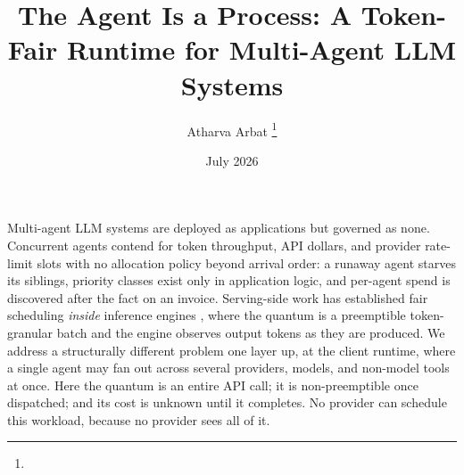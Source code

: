 \documentclass[letterpaper,11pt,leqno]{article}
\begin{document}
\title{The Agent Is a Process: A Token-Fair Runtime for Multi-Agent LLM Systems}

\author{Atharva Arbat
\thanks{}}

\date{July 2026}


\begin{titlepage}
\maketitle

Multi-agent LLM systems are deployed as applications but governed as none. Concurrent agents contend for token throughput, API dollars, and provider rate-limit slots with no allocation policy beyond arrival order: a runaway agent starves its siblings, priority classes exist only in application logic, and per-agent spend is discovered after the fact on an invoice. Serving-side work has established fair scheduling \emph{inside} inference engines \citep{Sheng24}, where the quantum is a preemptible token-granular batch and the engine observes output tokens as they are produced. We address a structurally different problem one layer up, at the client runtime, where a single agent may fan out across several providers, models, and non-model tools at once. Here the quantum is an entire API call; it is non-preemptible once dispatched; and its cost is unknown until it completes. No provider can schedule this workload, because no provider sees all of it.


\end{titlepage}
\end{document}
